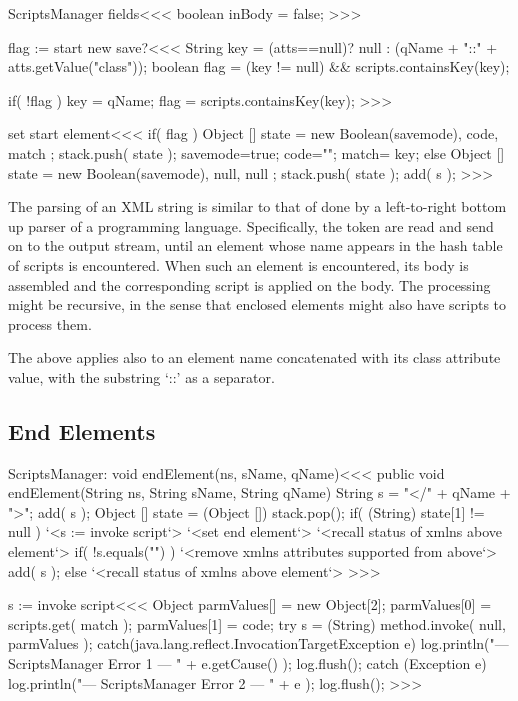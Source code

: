 \documentclass{article}
\begin{document}
\<ScriptsManager fields\><<<
boolean inBody = false;
>>>


\<flag := start new save?\><<<
String key = (atts==null)?
               null
             : (qName + "::" + atts.getValue("class"));
boolean flag = (key != null) && scripts.containsKey(key);

if( !flag ){
   key = qName;
   flag = scripts.containsKey(key);
}
>>>

\<set start element\><<<
if( flag ){
   Object [] state = { new Boolean(savemode), code, match };
   stack.push( state );
   savemode=true; code=""; match= key;
} else {
   Object [] state = { new Boolean(savemode), null, null };
   stack.push( state );
}
add( s );
>>>

The parsing of an XML string is similar to that of done by a
left-to-right bottom up parser of a programming language.
Specifically, the token are read and send on to the output stream,
until an element whose name appears in the hash table of scripts is
encountered.  When such an element is encountered, its body is
assembled and the corresponding script is applied on the body.  The
processing might be recursive, in the sense that enclosed elements
might also have scripts to process them.

The above applies also to an element name concatenated with its class
attribute value, with the substring `::' as a separator.

\subsection{End Elements}



\<ScriptsManager: void endElement(ns, sName, qName)\><<<
public void endElement(String ns, String sName, String qName){
   String s = "</" + qName + ">";
   add( s );
   Object [] state = (Object []) stack.pop();
   if( (String) state[1] != null ){
     `<s := invoke script`>
     `<set end element`>
     `<recall status of xmlns above element`>
     if( !s.equals("") ){
       `<remove xmlns attributes supported from above`>
       add( s );
     }
   } else { `<recall status of xmlns above element`> }
}
>>>







\<s := invoke script\><<<
Object parmValues[] = new Object[2];
parmValues[0] = scripts.get( match );
parmValues[1] = code;
try {
  s = (String) method.invoke( null, parmValues );
} catch(java.lang.reflect.InvocationTargetException e){
   log.println("--- ScriptsManager Error 1 --- " + e.getCause() );
   log.flush();
} catch (Exception e){
   log.println("--- ScriptsManager Error 2 --- " + e );
   log.flush();
}
>>>
\end{document}
